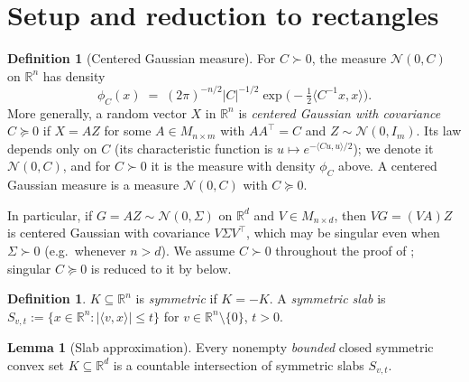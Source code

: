 \documentclass[12pt,a4paper]{article}
\theoremstyle{definition}
\newtheorem{lemma}[theorem]{Lemma}
\newtheorem{definition}[theorem]{Definition}
\newcommand{\R}{\mathbb{R}}
\newcommand{\caln}{\mathcal{N}}
\begin{document}
\section{Setup and reduction to rectangles}\label{sec:setup}

\begin{definition}[Centered Gaussian measure]\label{def:gaussian}
  For $C\succ 0$, the measure $\caln(0,C)$ on $\R^n$ has density
  \[
    \phi_C(x)
    \;=\;
    (2\pi)^{-n/2}|C|^{-1/2}
    \exp\bigl(-\tfrac{1}{2}\langle C^{-1}x,x\rangle\bigr).
  \]
  More generally, a random vector $X$ in $\R^n$ is \emph{centered
  Gaussian with covariance $C\succcurlyeq 0$} if $X=AZ$ for some
  $A\in M_{n\times m}$ with $AA^\top=C$ and $Z\sim\caln(0,I_m)$.  Its law
  depends only on $C$ (its characteristic function is
  $u\mapsto e^{-\langle Cu,u\rangle/2}$); we denote it $\caln(0,C)$, and
  for $C\succ 0$ it is the measure with density $\phi_C$ above.  A
  centered Gaussian measure is a measure $\caln(0,C)$ with
  $C\succcurlyeq 0$.
\end{definition}

In particular, if $G=AZ\sim\caln(0,\Sigma)$ on $\R^d$ and
$V\in M_{n\times d}$, then $VG=(VA)Z$ is centered Gaussian with
covariance $V\Sigma V^\top$, which may be singular even when
$\Sigma\succ 0$ (e.g.\ whenever $n>d$).  We assume $C\succ 0$ throughout
the proof of ; singular $C\succcurlyeq 0$ is reduced to
it by  below.

\begin{definition}\label{def:symconvex}
  $K\subseteq\R^n$ is \emph{symmetric} if $K=-K$.  A \emph{symmetric
  slab} is
  $S_{v,t}:=\{x\in\R^n:|\langle v,x\rangle|\leqslant t\}$ for
  $v\in\R^n\setminus\{0\}$, $t>0$.
\end{definition}

\begin{lemma}[Slab approximation]\label{lem:slab_approx}
  Every nonempty \emph{bounded} closed symmetric convex set
  $K\subseteq\R^d$ is a countable intersection of symmetric slabs
  $S_{v,t}$.
\end{lemma}
\end{document}
